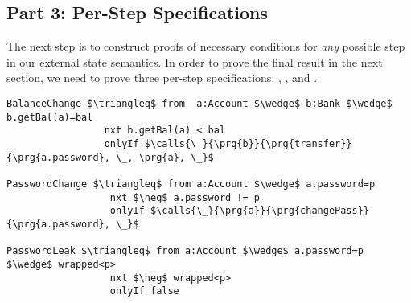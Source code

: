 \subsection{Part 3: Per-Step \Nec Specifications}
The next step is to construct proofs of necessary conditions for
\emph{any} possible step in our external state semantics.
In order to prove the final result in the next section,
we need to prove three per-step \Nec specifications: , , and .
\begin{lstlisting}[language=Chainmail, mathescape=true, frame=lines]
BalanceChange $\triangleq$ from  a:Account $\wedge$ b:Bank $\wedge$ b.getBal(a)=bal
                 nxt b.getBal(a) < bal
                 onlyIf $\calls{\_}{\prg{b}}{\prg{transfer}}{\prg{a.password}, \_, \prg{a}, \_}$
                 
PasswordChange $\triangleq$ from a:Account $\wedge$ a.password=p
                  nxt $\neg$ a.password != p
                  onlyIf $\calls{\_}{\prg{a}}{\prg{changePass}}{\prg{a.password}, \_}$
                  
PasswordLeak $\triangleq$ from a:Account $\wedge$ a.password=p $\wedge$ wrapped<p>
                  nxt $\neg$ wrapped<p>
                  onlyIf false
\end{lstlisting}
%
